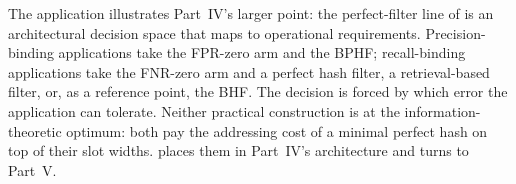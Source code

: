 The application illustrates Part~IV's larger point: the perfect-filter
line of  is an architectural decision space
that maps to operational requirements. Precision-binding applications
take the FPR-zero arm and the BPHF; recall-binding applications take the
FNR-zero arm and a perfect hash filter, a retrieval-based filter, or, as a
reference point, the BHF. The decision is forced by which error the
application can tolerate. Neither practical construction is at the
information-theoretic optimum: both pay the addressing cost of a minimal
perfect hash on top of their slot widths.
 places them in Part~IV's architecture and
turns to Part~V.
